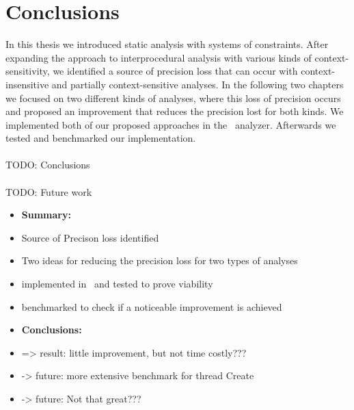 
\chapter{Conclusions}\label{chapter:conclusions}
  In this thesis we introduced static analysis with systems of constraints. After expanding the approach to interprocedural analysis with various kinds of context-sensitivity, we identified a source of precision loss that can occur with context-insensitive and partially context-sensitive analyses. In the following two chapters we focused on two different kinds of analyses, where this loss of precision occurs and proposed an improvement that reduces the precision lost for both kinds. We implemented both of our proposed approaches in the \gob\ analyzer. Afterwards we tested and benchmarked our implementation.\\
  \\
  TODO: Conclusions\\
  \\
  TODO: Future work

\begin{itemize}
  \item \textbf{Summary:}
  \item Source of Precison loss identified
  \item Two ideas for reducing the precision loss for two types of analyses
  \item implemented in \gob\ and tested to prove viability
  \item benchmarked to check if a noticeable improvement is achieved
  \item \textbf{Conclusions:}
  \item => result: little improvement, but not time costly???
  \item -> future: more extensive benchmark for thread Create
  \item -> future: Not that great???
\end{itemize}

